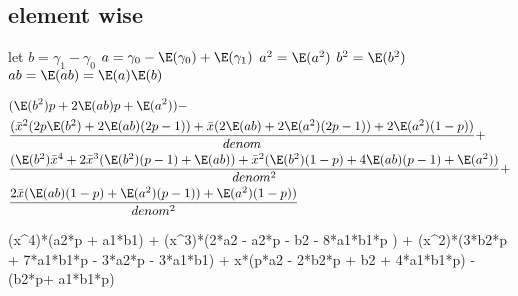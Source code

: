 \subsection{element wise}
let $b = \gamma_1 - \gamma_0$
$a = \gamma_0 - \E(\gamma_0) + \E(\gamma_1)$
$a^2 = \E(a^2)$
$b^2 = \E(b^2)$
$ab = \E(ab) = \E(a)\E(b)$


\begin{align*}
	&(\E(b^2)p + 2\E(ab)p + \E(a^2)) - \\
	&\frac{(\bar{x}^2(2p\E(b^2) + 2\E(ab)  (2p-1)) + \bar{x}(2\E(ab) + 2\E(a^2)(2p-1))+2\E(a^2)(1-p) )}{denom}  + \\
	&\frac{(\E(b^2)\bar{x}^4 + 2\bar{x}^3(\E(b^2)(p-1) + \E(ab)) + \bar{x}^2(\E(b^2)(1-p) + 4\E(ab)(p-1) + \E(a^2))}{denom^2} + \\
	&\frac{2\bar{x}( \E(ab)(1-p) + \E(a^2)(p-1)) + \E(a^2)(1-p))}{denom^2}
\end{align*} 






(x^4)*(a2*p + a1*b1) + (x^3)*(2*a2 - a2*p - b2 - 8*a1*b1*p ) + (x^2)*(3*b2*p + 7*a1*b1*p - 3*a2*p - 3*a1*b1) + x*(p*a2 - 2*b2*p + b2 + 4*a1*b1*p) - (b2*p+ a1*b1*p)

